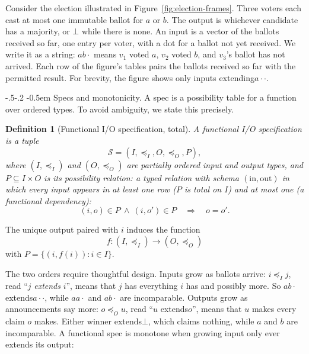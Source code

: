 \documentclass[sigconf]{cidr-2027}
\makeatletter
\newtheorem{definition}{Definition}
\theoremstyle{remark}
\renewcommand\paragraph{\@startsection{paragraph}{4}{\z@}%
  {-.5\baselineskip \@plus -2\p@ \@minus -.2\p@}%
  {-0.5em}%
  {\normalfont\bfseries}}
\newcommand{\InputOrd}{\preceq_I}
\newcommand{\OutputOrd}{\preceq_O}
\newcommand{\inrel}{extends\xspace}          %
\newcommand{\inrelpart}{extending\xspace}    %
\newcommand{\outrel}{extends\xspace}          %
\newcommand{\Spec}{\mathcal{S}}
\newcommand{\spectype}[1][]{I/O specification#1\xspace}
\makeatother
\begin{document}
\textcolor{reviewed}{Consider the election illustrated in
Figure~\ref{fig:election-frames}.} \textcolor{reviewed}{Three voters each cast at most one immutable
ballot for $a$ or $b$.} \textcolor{reviewed}{The output is whichever candidate has a majority, or
$\bot$ while there is none.} \textcolor{reviewed}{An input is a vector of the ballots received so
far, one entry per voter, with a dot for a ballot not yet received.} \textcolor{reviewed}{We write
it as a string: $ab\cdot$ means $v_1$ voted $a$, $v_2$ voted $b$, and $v_3$'s
ballot has not arrived.} \textcolor{reviewed}{Each row of the figure's tables pairs the ballots
received so far with the permitted result.} \textcolor{reviewed}{For brevity, the figure shows only
inputs \inrelpart $a\cdot\cdot$.}

\paragraph{Specs and monotonicity.}
\textcolor{reviewed}{A spec is a possibility table for a function over ordered types.} \textcolor{reviewed}{To avoid
ambiguity, we state this precisely.}

\begin{definition}[Functional \spectype, total]
\label{def:functional-specification}
\textcolor{reviewed}{A \emph{functional \spectype} is a tuple}
\[
  \Spec=(I,\InputOrd,O,\OutputOrd,P),
\]
\textcolor{reviewed}{where $(I,\InputOrd)$ and $(O,\OutputOrd)$ are partially ordered input and
  output types, and $P\subseteq I\times O$ is its \emph{possibility relation}:
  a typed relation with schema $(\mathrm{in},\mathrm{out})$ in which every
  input appears in at least one row ($P$ is \emph{total} on $I$) and at most one
  (a functional dependency):}
\[
  (i,o)\in P\ \land\ (i,o')\in P
  \quad\Longrightarrow\quad o=o'.
\]
\end{definition}

\textcolor{reviewed}{The unique output paired with $i$ induces the function}
\[f:(I,\InputOrd)\to(O,\OutputOrd)\]
with $P=\{(i,f(i)):i\in I\}.$

\textcolor{reviewed}{The two orders require thoughtful design.} \textcolor{reviewed}{Inputs grow as ballots arrive: $i\InputOrd j$, read ``$j$ \emph{\inrel} $i$'', means that
$j$ has everything $i$ has and possibly more.} \textcolor{reviewed}{So $ab\cdot$ \inrel $a\cdot\cdot$,
while $aa\cdot$ and $ab\cdot$ are incomparable.} \textcolor{reviewed}{Outputs grow as announcements
say more: $o\OutputOrd u$, read ``$u$ \outrel $o$'', means that $u$ makes every
claim $o$ makes.} \textcolor{reviewed}{Either winner \outrel $\bot$, which claims nothing, while $a$
and $b$ are incomparable.} \textcolor{reviewed}{A functional spec is monotone when growing input only
ever extends its output:}
\end{document}
